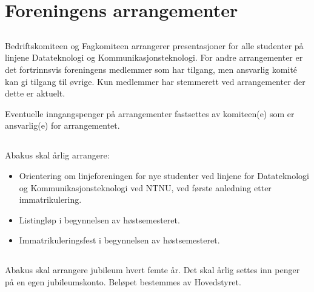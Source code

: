 \section{Foreningens arrangementer}

\subsection{}
Bedriftskomiteen og Fagkomiteen arrangerer presentasjoner for alle studenter på
linjene Datateknologi og Kommunikasjonsteknologi. For andre arrangementer er
det fortrinnsvis foreningens medlemmer som har tilgang, men ansvarlig komité
kan gi tilgang til øvrige. Kun medlemmer har stemmerett ved arrangementer der
dette er aktuelt.

Eventuelle inngangspenger på arrangementer fastsettes av komiteen(e) som er
ansvarlig(e) for arrangementet.

\subsection{}
Abakus skal årlig arrangere:

\begin{itemize}
  \item Orientering om linjeforeningen for nye studenter ved linjene for
        Datateknologi og Kommunikasjonsteknologi ved NTNU, ved første anledning etter immatrikulering.
  \item Listingløp i begynnelsen av høstsemesteret.
  \item Immatrikuleringsfest i begynnelsen av høstsemesteret.
\end{itemize}

\subsection{}
Abakus skal arrangere jubileum hvert femte år. Det skal årlig settes inn penger
på en egen jubileumskonto. Beløpet bestemmes av Hovedstyret.

